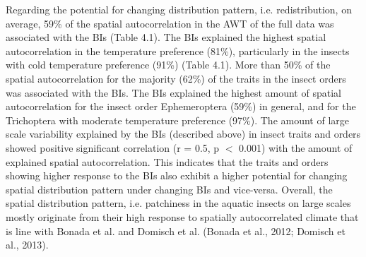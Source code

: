 Regarding the potential for changing distribution pattern, i.e. redistribution, on average, 59\% of the spatial autocorrelation in the AWT of the full data was associated with the BIs (Table 4.1). The BIs explained the highest spatial autocorrelation in the temperature preference (81\%), particularly in the insects with cold temperature preference (91\%) (Table 4.1). More than 50\% of the spatial autocorrelation for the majority (62\%) of the traits in the insect orders was associated with the BIs. The BIs explained the highest amount of spatial autocorrelation for the insect order Ephemeroptera (59\%) in general, and for the Trichoptera with moderate temperature preference (97\%). The amount of large scale variability explained by the BIs (described above) in insect traits and orders showed positive significant correlation (r = 0.5, p $<$ 0.001) with the amount of explained spatial autocorrelation. This indicates that the traits and orders showing higher response to the BIs also exhibit a higher potential for changing spatial distribution pattern under changing BIs and vice-versa. Overall, the spatial distribution pattern, i.e. patchiness in the aquatic insects on large scales mostly originate from their high response to spatially autocorrelated climate that is line with Bonada et al. and Domisch et al. (Bonada et al., 2012; Domisch et al., 2013).

